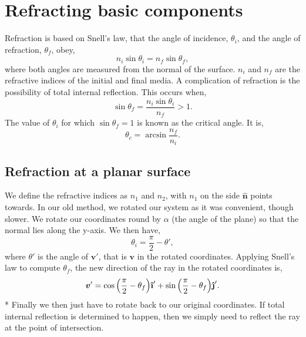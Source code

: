 \documentclass{article}
\let\vec \bm
\newcommand{\uveci}{{\bm{\hat{\textnormal{\bfseries\i}}}}}
\newcommand{\uvecj}{{\bm{\hat{\textnormal{\bfseries\j}}}}}
\begin{document}
\section{Refracting basic components}
Refraction is based on Snell's law, that the angle of incidence, $\theta_i$, and the angle of refraction, $\theta_f$, obey,
\begin{equation}
    n_i \sin \theta_i 
    =
    n_f \sin \theta_f,
\end{equation}
where both angles are measured from the normal of the surface. $n_i$ and $n_f$ are the refractive indices of the initial and final media. A complication of refraction is the possibility of total internal reflection. This occurs when,
\begin{equation}
    \sin \theta_f 
    =
    \frac{n_i \sin \theta_i}{n_f} > 1.
\end{equation}
The value of $\theta_i$ for which $\sin{\theta_f} = 1$ is known as the critical angle. It is,
\begin{equation}
    \theta_c
    =
    \arcsin{\frac{n_f}{n_i}}.
\end{equation}

\subsection{Refraction at a planar surface}
We define the refractive indices as $n_1$ and $n_2$, with $n_1$ on the side $\vec{\hat{n}}$ points towards. In our old method, we rotated our system as it was convenient, though slower. We rotate our coordinates round by $\alpha$ (the angle of the plane) so that the normal lies along the y-axis. We then have,
\begin{equation}
    \theta_i 
    =
    \frac{\pi}{2} - \theta',
\end{equation}
where $\theta'$ is the angle of $\vec{v}'$, that is $\vec v$ in the rotated coordinates. Applying Snell's law to compute $\theta_f$, the new direction of the ray in the rotated coordinates is,
\begin{equation}
    \vec{v}'
    = 
    \cos{
    \left(
        \frac{\pi}{2} - \theta_f
    \right)
    } \uveci'
    +
    \sin{
    \left(
        \frac{\pi}{2} - \theta_f
    \right)
    } \uvecj'.
\end{equation}*
Finally we then just have to rotate back to our original coordinates. If total internal reflection is determined to happen, then we simply need to reflect the ray at the point of intersection.
\end{document}
